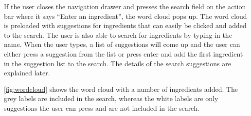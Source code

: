 If the user closes the navigation drawer and presses the search field on the action bar where it says ``Enter an ingredient'', the word cloud pops up. The word cloud is preloaded with suggestions for ingredients that can easily be clicked and added to the search. The user is also able to search for ingredients by typing in the name. When the user types, a list of suggestions will come up and the user can either press a suggestion from the list or press enter and add the first ingredient in the suggestion list to the search. The details of the search suggestions are explained later.

\autoref{fig:wordcloud} shows the word cloud with a number of ingredients added. The grey labels are included in the search, whereas the white labels are only suggestions the user can press and are not included in the search.


